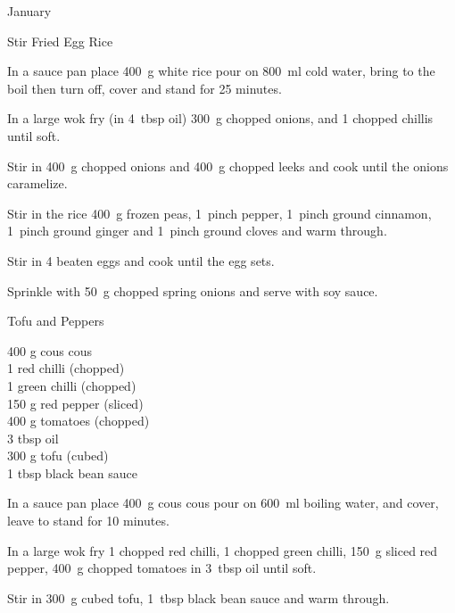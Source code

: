 \begin{menu}{January}
\begin{recipe}{2}{Stir Fried Egg Rice}
\begin{ingredients}
		\end{ingredients}
	
	
    \begin{instructions}
    \item 
    In a
    sauce pan
    place
    400~g  white rice
    pour on
    800~ml  cold water,
    bring to the boil then turn off, cover and stand for 25 minutes.
  \item 
        In a large wok fry
        (in 4~tbsp  oil)
        300~g chopped onions,
        and
        1 chopped chillis
        until soft.
      \item 
        Stir in
        400~g chopped onions
        and
        400~g chopped leeks
        and cook until the onions caramelize.
      \item 
        Stir in the rice
        400~g  frozen peas,
        1~pinch  pepper,
        1~pinch  ground cinnamon,
        1~pinch  ground ginger
        and
        1~pinch  ground cloves
        and warm through.
      \item 
        Stir in
        4 beaten eggs
        and cook until the egg sets.
      \item 
        Sprinkle with
        50~g chopped spring onions
        and serve with
          soy sauce.
      
    \end{instructions}
    \end{recipe}%
  
    \begin{recipe}{2}{Tofu and Peppers}%
		\begin{ingredients}
		400 g cous cous  \\
	1  red chilli (chopped) \\
	1  green chilli (chopped) \\
	150 g red pepper (sliced) \\
	400 g tomatoes (chopped) \\
	3 tbsp oil  \\
	300 g tofu (cubed) \\
	1 tbsp black bean sauce  \\
	
		\end{ingredients}
	
	
    \begin{instructions}
    \item 
    In a
    sauce pan 
    place
    400~g  cous cous
    pour on
    600~ml  boiling water,
    and cover, leave to stand for 10 minutes.
  \item 
        In a large wok fry
        1 chopped red chilli,
        1 chopped green chilli,
        150~g sliced red pepper,
        400~g chopped tomatoes
        in
        3~tbsp  oil
        until soft.
      \item 
        Stir in
        300~g cubed tofu,
        1~tbsp  black bean sauce
        and warm through.
      

\end{instructions}
\end{recipe}
\end{menu}

